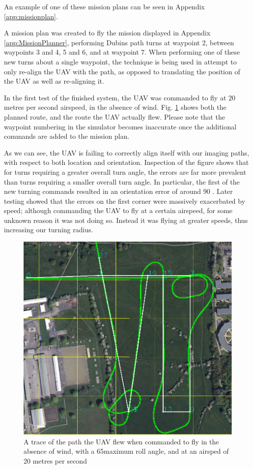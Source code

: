 An example of one of these mission plans can be seen in Appendix \ref{app:missionplan}.

A mission plan was created to fly the mission displayed in Appendix \ref{app:MissionPlanner}, performing Dubins path turns at waypoint 2, between waypoints 3 and 4, 5 and 6, and at waypoint 7. When performing one of these new turns about a single waypoint, the technique is being used in attempt to only re-align the UAV with the path, as opposed to translating the position of the UAV as well as re-aligning it. 

In the first test of the finished system, the UAV was commanded to fly at 20 metres per second airspeed, in the absence of wind. Fig. \ref{fig:6520nowind} shows both the planned route, and the route the UAV actually flew. Please note that the waypoint numbering in the simulator becomes inaccurate once the additional commands are added to the mission plan. 

As we can see, the UAV is failing to correctly align itself with our imaging paths, with respect to both location and orientation. Inspection of the figure shows that for turns requiring a greater overall turn angle, the errors are far more prevalent than turns requiring a smaller overall turn angle. In particular, the first of the new turning commands resulted in an orientation error of around 90 \degree. Later testing showed that the errors on the first corner were massively exacerbated by speed; although commanding the UAV to fly at a certain airspeed, for some unknown reason it was not doing so. Instead it was flying at greater speeds, thus increasing our turning radius.

\begin{figure}[htbp!] 
\centering    
\includegraphics[width=\textwidth]{65_20_NoWind}
\caption[Flying Dubins path turns in the absence of wind]{A trace of the path the UAV flew when commanded to fly in the absence of wind, with a 65\degree  maximum roll angle, and at an airsped of 20 metres per second}
\label{fig:6520nowind}
\end{figure} 

